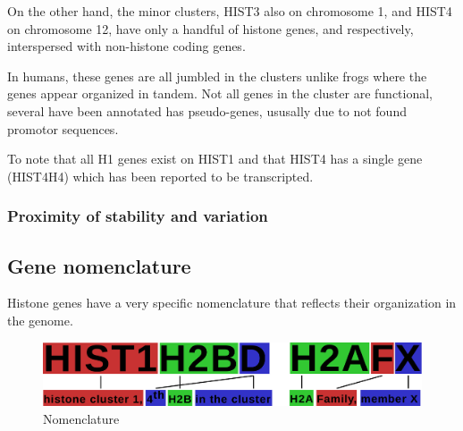 \documentclass[10pt,a4paper,draft,article]{memoir}
\begin{document}
        On the other hand, the minor clusters, HIST3 also on chromosome 1, and HIST4 on
        chromosome 12, have only a handful of histone genes, \CodingGenesInHISTThree{} and
        \CodingGenesInHISTFour{} respectively, interspersed with non-histone coding genes.


        In humans, these genes are all jumbled in the clusters unlike
        frogs where the genes appear organized in tandem. Not all genes in the cluster are functional, several have
        been annotated has pseudo-genes, ususally due to not found promotor sequences.

        To note that all H1 genes exist on HIST1 and that HIST4 has a single gene (HIST4H4) which has been reported to be transcripted.




        \subsubsection{Proximity of stability and variation}

    \subsection{Gene nomenclature}

      Histone genes have a very specific nomenclature that reflects their organization in the genome.

      \begin{figure}
        \centering
        \includegraphics[width=\textwidth]{nomenclature-schematic.pdf}
        \caption{Nomenclature}
        \label{fig:nomenclature}
      \end{figure}
\end{document}
